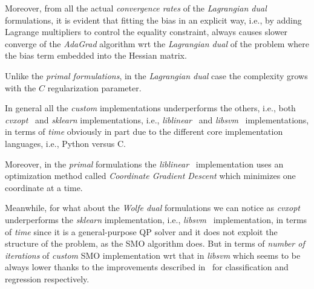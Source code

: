 Moreover, from all the actual \emph{convergence rates} of the \emph{Lagrangian dual} formulations, it is evident that fitting the bias in an explicit way, i.e., by adding Lagrange multipliers to control the equality constraint, always causes slower converge of the \emph{AdaGrad} algorithm wrt the \emph{Lagrangian dual} of the problem where the bias term embedded into the Hessian matrix.

Unlike the \emph{primal formulations}, in the \emph{Lagrangian dual} case the complexity grows with the $C$ regularization parameter.

\bigskip

In general all the \emph{custom} implementations underperforms the others, i.e., both \emph{cvxopt}~\cite{vandenberghe2010cvxopt} and \emph{sklearn} implementations, i.e., \emph{liblinear}~\cite{fan2008liblinear} and \emph{libsvm}~\cite{chang2011libsvm} implementations, in terms of \emph{time} obviously in part due to the different core implementation languages, i.e., Python versus C. 

Moreover, in the \emph{primal} formulations the \emph{liblinear}~\cite{fan2008liblinear} implementation uses an optimization method called \emph{Coordinate Gradient Descent} which minimizes one coordinate at a time.

Meanwhile, for what about the \emph{Wolfe dual} formulations we can notice as \emph{cvxopt}~\cite{vandenberghe2010cvxopt} underperforms the \emph{sklearn} implementation, i.e., \emph{libsvm}~\cite{chang2011libsvm} implementation, in terms of \emph{time} since it is a general-purpose QP solver and it does not exploit the structure of the problem, as the SMO algorithm does. But in terms of \emph{number of iterations} of \emph{custom} SMO implementation wrt that in \emph{libsvm} which seems to be always lower thanks to the improvements described in~\cite{keerthi2001improvements, shevade1999improvements} for classification and regression respectively.
